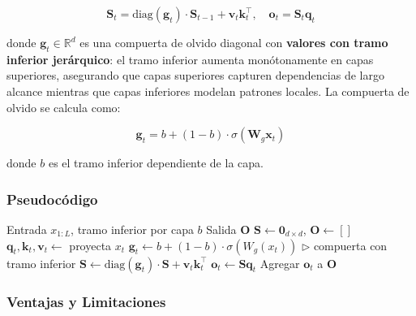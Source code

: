\documentclass[11pt,a4paper]{article}
\begin{document}
\begin{equation}
\mathbf{S}_t = \text{diag}(\mathbf{g}_t) \cdot \mathbf{S}_{t-1} + \mathbf{v}_t \mathbf{k}_t^\top, \quad \mathbf{o}_t = \mathbf{S}_t \mathbf{q}_t
\end{equation}

donde $\mathbf{g}_t \in \mathbb{R}^d$ es una compuerta de olvido diagonal con \textbf{valores con tramo inferior jerárquico}: el tramo inferior aumenta monótonamente en capas superiores, asegurando que capas superiores capturen dependencias de largo alcance mientras que capas inferiores modelan patrones locales. La compuerta de olvido se calcula como:

\begin{equation}
\mathbf{g}_t = b + (1 - b) \cdot \sigma(\mathbf{W}_g \mathbf{x}_t)
\end{equation}

donde $b$ es el tramo inferior dependiente de la capa.

\subsubsection{Pseudocódigo}

\begin{algorithm}
\caption{HGRN2 - Retención de Red Recurrente Jerárquicamente Compuertada}
\begin{algorithmic}[1]
\Require Entrada $x_{1:L}$, tramo inferior por capa $b$
\Ensure Salida $\mathbf{O}$
\State $\mathbf{S} \gets \mathbf{0}_{d \times d}$, $\mathbf{O} \gets []$
    \State $\mathbf{q}_t, \mathbf{k}_t, \mathbf{v}_t \gets$ proyecta $x_t$
    \State $\mathbf{g}_t \gets b + (1 - b) \cdot \sigma(W_g(x_t))$ \quad $\triangleright$ compuerta con tramo inferior
    \State $\mathbf{S} \gets \text{diag}(\mathbf{g}_t) \cdot \mathbf{S} + \mathbf{v}_t \mathbf{k}_t^\top$
    \State $\mathbf{o}_t \gets \mathbf{S} \mathbf{q}_t$
    \State Agregar $\mathbf{o}_t$ a $\mathbf{O}$
\EndFor
\end{algorithmic}
\end{algorithm}

\subsubsection{Ventajas y Limitaciones}
\end{document}
